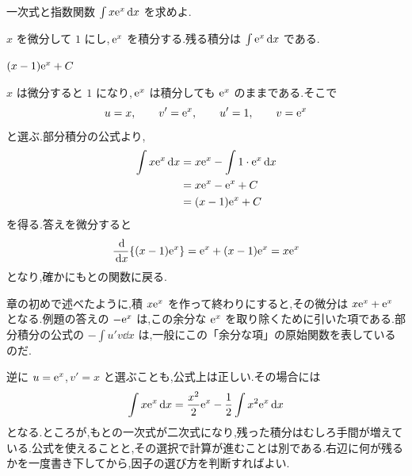 \begin{example}{一次式と指数関数}
$\int x\mathrm{e}^x\,\mathrm{d} x$ を求めよ.
\end{example}

$x$ を微分して $1$ にし,\,$\mathrm{e}^x$ を積分する.残る積分は $\int\mathrm{e}^x\,\mathrm{d} x$ である.

$(x-1)\mathrm{e}^x+C$

$x$ は微分すると $1$ になり,\,$\mathrm{e}^x$ は積分しても $\mathrm{e}^x$ のままである.そこで
\[
 u=x,\qquad v'=\mathrm{e}^x,
 \qquad u'=1,\qquad v=\mathrm{e}^x
\]
と選ぶ.部分積分の公式より,
\[
\begin{aligned}
 \int x\mathrm{e}^x\,\mathrm{d} x
 &=x\mathrm{e}^x-\int 1\cdot\mathrm{e}^x\,\mathrm{d} x\\
 &=x\mathrm{e}^x-\mathrm{e}^x+C\\
 &=(x-1)\mathrm{e}^x+C
\end{aligned}
\]
を得る.答えを微分すると
\[
 \frac{\,\mathrm{d}}{\,\mathrm{d} x}\{(x-1)\mathrm{e}^x\}
 =\mathrm{e}^x+(x-1)\mathrm{e}^x
 =x\mathrm{e}^x
\]
となり,確かにもとの関数に戻る.

章の初めで述べたように,積 $x\mathrm{e}^x$ を作って終わりにすると,その微分は $x\mathrm{e}^x+\mathrm{e}^x$ となる.例題の答えの $-\mathrm{e}^x$ は,この余分な $\mathrm{e}^x$ を取り除くために引いた項である.部分積分の公式の $-\int u'v\dd x$ は,一般にこの「余分な項」の原始関数を表しているのだ.

逆に $u=\mathrm{e}^x$,\,$v'=x$ と選ぶことも,公式上は正しい.その場合には
\[
 \int x\mathrm{e}^x\,\mathrm{d} x
 =\frac{x^2}{2}\mathrm{e}^x-\frac12\int x^2\mathrm{e}^x\,\mathrm{d} x
\]
となる.ところが,もとの一次式が二次式になり,残った積分はむしろ手間が増えている.公式を使えることと,その選択で計算が進むことは別である.右辺に何が残るかを一度書き下してから,因子の選び方を判断すればよい.
